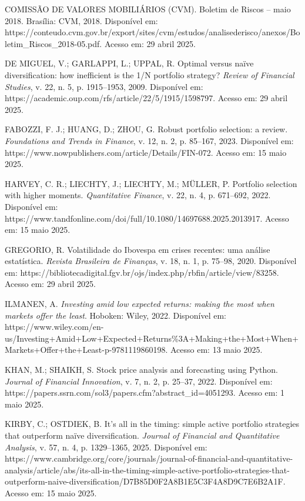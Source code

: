 \begin{thebibliography}{99}
COMISSÃO DE VALORES MOBILIÁRIOS (CVM). Boletim de Riscos -- maio 2018. Brasília: CVM, 2018. Disponível em: https://conteudo.cvm.gov.br/export/sites/cvm/estudos/analisederisco/anexos/Boletim\_Riscos\_2018-05.pdf. Acesso em: 29 abril 2025.

DE MIGUEL, V.; GARLAPPI, L.; UPPAL, R. Optimal versus naïve diversification: how inefficient is the 1/N portfolio strategy? \textit{Review of Financial Studies}, v. 22, n. 5, p. 1915--1953, 2009. Disponível em: https://academic.oup.com/rfs/article/22/5/1915/1598797. Acesso em: 29 abril 2025.

FABOZZI, F. J.; HUANG, D.; ZHOU, G. Robust portfolio selection: a review. \textit{Foundations and Trends in Finance}, v. 12, n. 2, p. 85--167, 2023. Disponível em: https://www.nowpublishers.com/article/Details/FIN-072. Acesso em: 15 maio 2025.

HARVEY, C. R.; LIECHTY, J.; LIECHTY, M.; MÜLLER, P. Portfolio selection with higher moments. \textit{Quantitative Finance}, v. 22, n. 4, p. 671--692, 2022. Disponível em: https://www.tandfonline.com/doi/full/10.1080/14697688.2025.2013917. Acesso em: 15 maio 2025.

GREGORIO, R. Volatilidade do Ibovespa em crises recentes: uma análise estatística. \textit{Revista Brasileira de Finanças}, v. 18, n. 1, p. 75--98, 2020. Disponível em: https://bibliotecadigital.fgv.br/ojs/index.php/rbfin/article/view/83258. Acesso em: 29 abril 2025.

ILMANEN, A. \textit{Investing amid low expected returns: making the most when markets offer the least}. Hoboken: Wiley, 2022. Disponível em: https://www.wiley.com/en-us/Investing+Amid+Low+Expected+Returns\%3A+Making+the+Most+When+Markets+Offer+the+Least-p-9781119860198. Acesso em: 13 maio 2025.

KHAN, M.; SHAIKH, S. Stock price analysis and forecasting using Python. \textit{Journal of Financial Innovation}, v. 7, n. 2, p. 25--37, 2022. Disponível em: https://papers.ssrn.com/sol3/papers.cfm?abstract\_id=4051293. Acesso em: 1 maio 2025.

KIRBY, C.; OSTDIEK, B. It's all in the timing: simple active portfolio strategies that outperform naïve diversification. \textit{Journal of Financial and Quantitative Analysis}, v. 57, n. 4, p. 1329--1365, 2025. Disponível em: https://www.cambridge.org/core/journals/journal-of-financial-and-quantitative-analysis/article/abs/its-all-in-the-timing-simple-active-portfolio-strategies-that-outperform-naive-diversification/D7B85D0F2A8B1E5C3F4A8D9C7E6B2A1F. Acesso em: 15 maio 2025.


\end{thebibliography}
